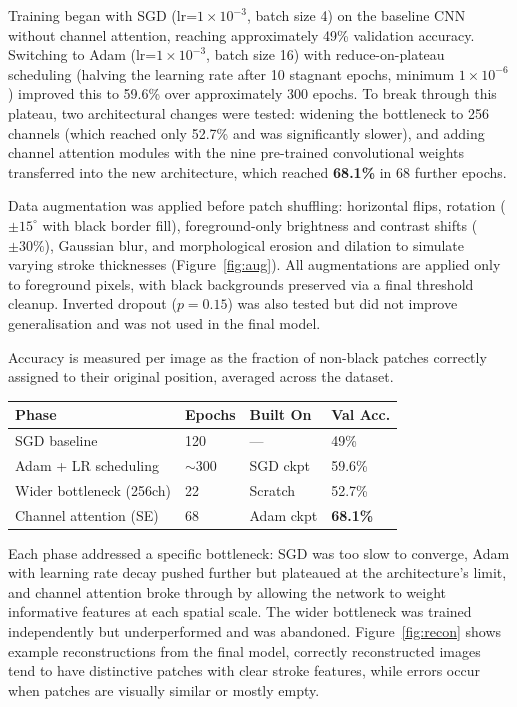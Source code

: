 \documentclass[conference]{IEEEtran}
\makeatletter
\renewcommand{\subsection}{\@startsection{subsection}{2}{\z@}{-0.3em}{0.01em}{\normalfont\normalsize\bfseries}}
\makeatother
\begin{document}
Training began with SGD (lr=$1\times10^{-3}$, batch size 4) on the baseline CNN without channel attention, reaching approximately 49\% validation accuracy. Switching to Adam (lr=$1\times10^{-3}$, batch size 16) with reduce-on-plateau scheduling (halving the learning rate after 10 stagnant epochs, minimum $1\times10^{-6}$) improved this to 59.6\% over approximately 300 epochs. To break through this plateau, two architectural changes were tested: widening the bottleneck to 256 channels (which reached only 52.7\% and was significantly slower), and adding channel attention modules with the nine pre-trained convolutional weights transferred into the new architecture, which reached \textbf{68.1\%} in 68 further epochs.

Data augmentation was applied before patch shuffling: horizontal flips, rotation ($\pm15^{\circ}$ with black border fill), foreground-only brightness and contrast shifts ($\pm30\%$), Gaussian blur, and morphological erosion and dilation to simulate varying stroke thicknesses (Figure~\ref{fig:aug}). All augmentations are applied only to foreground pixels, with black backgrounds preserved via a final threshold cleanup. Inverted dropout ($p=0.15$) was also tested but did not improve generalisation and was not used in the final model.


\subsection{Evaluation}

Accuracy is measured per image as the fraction of non-black patches correctly assigned to their original position, averaged across the dataset.

\begin{table}[H]
\centering
\small
\begin{tabular}{@{}llll@{}}
\toprule
Phase & Epochs & Built On & Val Acc. \\
\midrule
SGD baseline & 120 & --- & 49\% \\
Adam + LR scheduling & $\sim$300 & SGD ckpt & 59.6\% \\
Wider bottleneck (256ch) & 22 & Scratch & 52.7\% \\
Channel attention (SE) & 68 & Adam ckpt & \textbf{68.1\%} \\
\bottomrule
\end{tabular}
\label{tab:training}
\end{table}

Each phase addressed a specific bottleneck: SGD was too slow to converge, Adam with learning rate decay pushed further but plateaued at the architecture's limit, and channel attention broke through by allowing the network to weight informative features at each spatial scale. The wider bottleneck was trained independently but underperformed and was abandoned. Figure~\ref{fig:recon} shows example reconstructions from the final model, correctly reconstructed images tend to have distinctive patches with clear stroke features, while errors occur when patches are visually similar or mostly empty.
\end{document}
